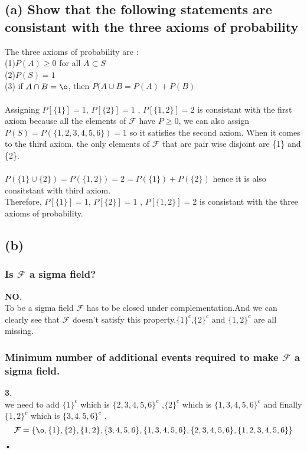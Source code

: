 \documentclass[a4paper,11pt]{article}
\begin{document}
\subsection*{(a) Show that the following statements are consistant with the three axioms of probability}
The three axioms of probability are :\\
(1)$P(A) \ge 0$ for all $A \subset S$ \\
(2)$P(S) = 1$\\
(3) if $A \cap B = \o$, then $P(A \cup B = P(A)+P(B)$  \\\\
Assigning $P[\{1\}]=1$, $P[\{2\}]=1$ , $P[\{1,2\}]=2$ is consistant with the first axiom because all the elements of $\mathcal{F}$ have $P \ge 0$, we can also assign $P(S) = P(\{1,2,3,4,5,6\}) = 1$ so it satisfies the second axiom.
When it comes to the third axiom, the only elements of $\mathcal{F}$ that are pair wise disjoint are \{1\} and \{2\}.\\\\
 $P(\{1\}\cup \{2\})=P(\{1,2\}) = 2 = P(\{1\}) + P(\{2\})$ hence it is also consitstant with third axiom.\\
 Therefore, $P[\{1\}]=1$, $P[\{2\}]=1$ , $P[\{1,2\}]=2$ is consistant with the three axioms of probability.

\subsection*{(b)}

\subsubsection*{Is $\mathcal{F}$ a sigma field?}
\textbf{NO}.\\
To be a sigma field $\mathcal{F}$ has to be closed under complementation.And we can clearly see that $\mathcal{F}$ doesn't satisfy this property.$\{1\}^c$,$\{2\}^c$ and $\{1,2\}^c$ are all missing. \\
\subsubsection*{Minimum number of additional events required to make  $\mathcal{F}$ a sigma field.}
\textbf{3}.\\
we need to add $\{1\}^c$ which is $\{2,3,4,5,6\}^c$ ,$\{2\}^c$ which is $\{1,3,4,5,6\}^c$ and finally $\{1,2\}^c$ which is $\{3,4,5,6\}^c$ .\\
\begin{equation}\label{eq:new_f}
\mathcal{F} = \{ \o , \{1\},\{2\},\{1,2\},\{3,4,5,6\},\{1,3,4,5,6\},\{2,3,4,5,6\},\{1,2,3,4,5,6\}\}
\end{equation}•
\end{document}
